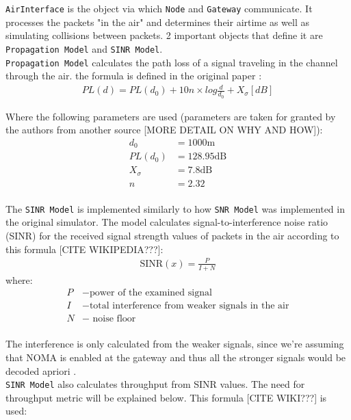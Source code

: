 \texttt{AirInterface} is the object via which \texttt{Node} and \texttt{Gateway} communicate. It processes the packets "in the air" and determines their airtime as well as simulating collisions between packets. 2 important objects that define it are \texttt{Propagation Model} and \texttt{SINR Model}.\\

\texttt{Propagation Model} calculates the path loss 
of a signal traveling in the channel through the air.
the formula is defined in the original paper \cite{simulator} :
\begin{align}
    PL(d) = PL(d_0) + 10n\times log\frac{d}{d_0} + X_{\sigma} [dB] \label{eq:propagation_model}
\end{align}

Where the following parameters are used (parameters are taken for granted by the authors \cite{simulator} from another source \cite{propagation_model_parameters} [MORE DETAIL ON WHY AND HOW]):
\begin{align*}
     d_0 & = 1000 \text{m}\\
     PL(d_0) & = 128.95 \text{dB}\\
     X_{\sigma} & = 7.8 \text{dB}\\
     n & = 2.32\\
\end{align*}

The \texttt{SINR Model} is implemented similarly to how \texttt{SNR Model} was implemented in the original simulator. The model calculates signal-to-interference noise ratio (SINR) for the received signal strength values of packets in the air according to this formula [CITE WIKIPEDIA???]:
\begin{align}
    \text{SINR}(x) = \frac{P}{I + N} \label{eq:sinr}
\end{align}
where:
\begin{align*}
     P &- \text{power of the examined signal}\\
     I &- \text{total interference from weaker signals in the air}\\
     N &- \text{ noise floor}\\
\end{align*}

The interference is only calculated from the weaker signals, since we're assuming that NOMA is enabled at 
the gateway and thus all the stronger signals would be
decoded apriori \cite{noma_original}.\\

\texttt{SINR Model} also calculates throughput from SINR values. The need for throughput metric will be explained below. This formula [CITE WIKI???] is used:

